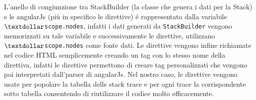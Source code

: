 L'anello di congiunzione tra StackBuilder (la classe che genera i dati per la Stack) e le angularJs (più in specifico le direttive)
é rappresentato dalla variabile \texttt{$\textdollar$scope.nodes}, infatti i dati generati da \texttt{StackBuilder} vengono memorizzati su tale variabile e successivamente le direttive, utilizzano \texttt{$\textdollar$scope.nodes} come fonte dati. Le direttive vengono infine richiamate nel codice HTML semplicemente creando un
tag con lo stesso nome della direttiva, infatti le direttive permettono di creare
tag personalizzati che vengono poi interpretati dall'parser di angularJs.
Nel nostro caso, le direttive vengono usate per popolare la tabella delle stack trace
e per ogni trace la corrispondente sotto tabella consentendo di riutilizzare il codice
molto efficacemente.
